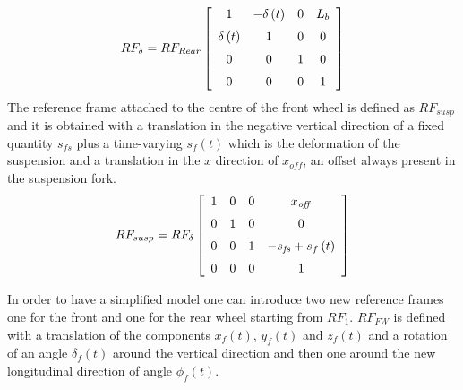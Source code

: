 \begin{equation}
    RF_{\delta} = RF_{Rear} 
    \left[ \begin {array}{cccc} 1&-\delta \left( t \right) &0&L_{b}
    \\ \noalign{\medskip}\delta \left( t \right) &1&0&0
    \\ \noalign{\medskip}0&0&1&0\\ \noalign{\medskip}0&0&0&1\end {array}
     \right]    
\end{equation}
The reference frame attached to the centre of the front wheel is defined as $RF_{susp}$ and it is obtained with a translation in the negative vertical direction of a fixed quantity $s_{fs}$ plus a time-varying $s_f(t)$ which is the deformation of the suspension and a translation in the $x$ direction of $x_{off}$, an offset always present in the suspension fork.
\begin{equation}
    RF_{susp} = RF_\delta 
    \left[ \begin {array}{cccc} 1&0&0&x_{{\it off}}\\ \noalign{\medskip}0
    &1&0&0\\ \noalign{\medskip}0&0&1&-s_{{\it fs}}+s_{f} \left( t \right) 
    \\ \noalign{\medskip}0&0&0&1\end {array} \right] 
\end{equation}

In order to have a simplified model one can introduce two new reference frames one for the front and one for the rear wheel starting from $RF_1$. $RF_{FW}$ is defined with a translation of the components $x_f(t)$, $y_f(t)$ and $z_f(t)$ and a rotation of an angle $\delta_f(t)$ around the vertical direction and then one around the new longitudinal direction of angle $\phi_f(t)$. 
